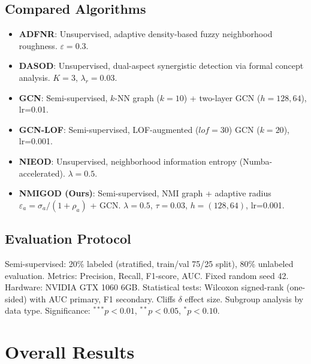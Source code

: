 \documentclass[11pt,a4paper]{article}
\begin{document}
\subsection{Compared Algorithms}
\begin{itemize}[leftmargin=*]
\item \textbf{ADFNR}: Unsupervised, adaptive density-based fuzzy neighborhood roughness. $\varepsilon=0.3$.
\item \textbf{DASOD}: Unsupervised, dual-aspect synergistic detection via formal concept analysis. $K{=}3$, $\lambda_r{=}0.03$.
\item \textbf{GCN}: Semi-supervised, $k$-NN graph ($k{=}10$) + two-layer GCN ($h{=}128,64$), lr{=}0.01.
\item \textbf{GCN-LOF}: Semi-supervised, LOF-augmented ($lof{=}30$) GCN ($k{=}20$), lr{=}0.001.
\item \textbf{NIEOD}: Unsupervised, neighborhood information entropy (Numba-accelerated). $\lambda{=}0.5$.
\item \textbf{NMIGOD (Ours)}: Semi-supervised, NMI graph + adaptive radius $\varepsilon_a{=}\sigma_a/(1{+}\rho_a)$ + GCN. $\lambda{=}0.5$, $\tau{=}0.03$, $h{=}(128,64)$, lr{=}0.001.
\end{itemize}

\subsection{Evaluation Protocol}
Semi-supervised: 20\% labeled (stratified, train/val 75/25 split), 80\% unlabeled evaluation. Metrics: Precision, Recall, F1-score, AUC. Fixed random seed 42. Hardware: NVIDIA GTX 1060 6GB. Statistical tests: Wilcoxon signed-rank (one-sided) with AUC primary, F1 secondary. Cliffs $\delta$ effect size. Subgroup analysis by data type. Significance: $^{***}p{<}0.01$, $^{**}p{<}0.05$, $^{*}p{<}0.10$.

\section{Overall Results}
\end{document}
